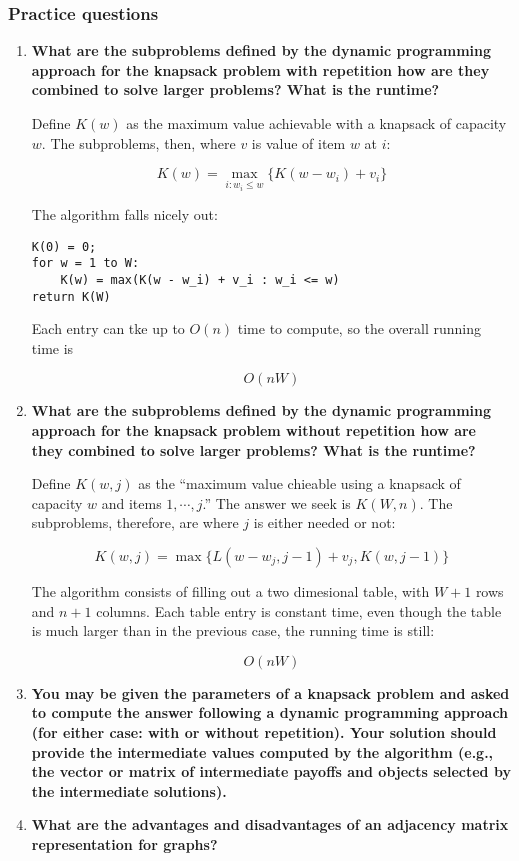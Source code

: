 \documentclass[a4paper,11pt]{article}
\begin{document}
\subsubsection{Practice questions}\label{practice-questions-11}

\begin{enumerate}
\def\labelenumi{\arabic{enumi}.}
\item
  \textbf{What are the subproblems defined by the dynamic programming
  approach for the knapsack problem with repetition how are they
  combined to solve larger problems? What is the runtime?}

  Define $K(w)$ as the maximum value achievable with a knapsack of
  capacity $w$. The subproblems, then, where $v$ is value of item $w$ at
  $i$:

  \[K(w) = \max_{i:w_i \le w} \lbrace K(w - w_i) + v_i \rbrace\]

  The algorithm falls nicely out:

\begin{verbatim}
K(0) = 0;
for w = 1 to W:
    K(w) = max(K(w - w_i) + v_i : w_i <= w)
return K(W)
\end{verbatim}

  Each entry can tke up to $O(n)$ time to compute, so the overall
  running time is

  \[O(nW)\]
\item
  \textbf{What are the subproblems defined by the dynamic programming
  approach for the knapsack problem without repetition how are they
  combined to solve larger problems? What is the runtime?}

  Define $K(w, j)$ as the ``maximum value chieable using a knapsack of
  capacity $w$ and items $1, \cdots, j$.'' The answer we seek is
  $K(W,n)$. The subproblems, therefore, are where $j$ is either needed
  or not:

  \[K(w, j) = \max \lbrace L(w - w_j, j - 1) + v_j, K(w, j - 1) \rbrace\]

  The algorithm consists of filling out a two dimesional table, with
  $W + 1$ rows and $n + 1$ columns. Each table entry is constant time,
  even though the table is much larger than in the previous case, the
  running time is still:

  \[O(nW)\]
\item
  \textbf{You may be given the parameters of a knapsack problem and
  asked to compute the answer following a dynamic programming approach
  (for either case: with or without repetition). Your solution should
  provide the intermediate values computed by the algorithm (e.g., the
  vector or matrix of intermediate payoffs and objects selected by the
  intermediate solutions).}
\item
  \textbf{What are the advantages and disadvantages of an adjacency
  matrix representation for graphs?}


\end{enumerate}
\end{document}
